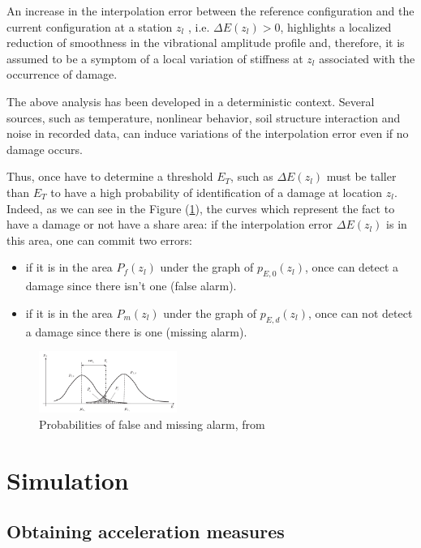 \documentclass[journal]{IEEEtran}
\begin{document}
An increase in the interpolation error between the reference configuration and the current configuration at a station $z_l$ , i.e.
$ \Delta E(z_l) > 0$, highlights a localized reduction of smoothness in the vibrational amplitude profile and, therefore, it is assumed
to be a symptom of a local variation of stiffness at $z_l$ associated with the occurrence of damage.

The above analysis has been developed in a deterministic context. Several sources, such as temperature, nonlinear
behavior, soil structure interaction and noise in recorded data, can induce variations of the interpolation error even if no
damage occurs.

Thus, once have to determine a threshold $E_T$, such as $ \Delta E(z_l)$ must be taller than $E_T$ to have a high probability of identification of a damage at location $z_l$. Indeed, as we can see in the Figure (\ref{proba}), the curves which represent the fact to have a damage or not have a share area: if the interpolation error $ \Delta E(z_l)$ is in this area, one can commit two errors:
\begin{itemize}
\item if it is in the area $P_f(z_l)$ under the graph of $p_{E,0}(z_l)$, once can detect a damage since there isn't one (false alarm).
\item if it is in the area $P_m(z_l)$ under the graph of $p_{E,d}(z_l)$, once can not detect a damage since there is one (missing alarm).
\end{itemize}


\begin{figure}
  \centering
  \includegraphics[width=0.4\textwidth]{images/gaussiennes.png}
  \caption{Probabilities of false and missing alarm, from \cite{dilena2015damage}}
  \label{proba}
\end{figure}

\section{Simulation}

\subsection{Obtaining acceleration measures}
\end{document}

